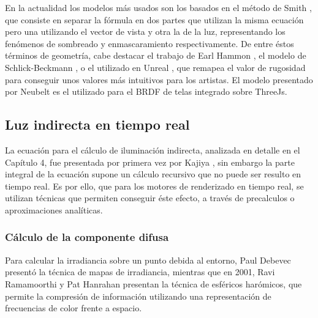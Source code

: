                 
                En la actualidad los modelos m\'as usados son los basados en el m\'etodo de Smith \autocite{smith}, que
                consiste en separar la f\'ormula en dos partes que utilizan la misma ecuaci\'on pero una utilizando el vector de vista
                y otra la de la luz, representando los fen\'omenos de sombreado y enmascaramiento respectivamente. De entre \'estos t\'erminos
                de geometr\'ia, cabe destacar el trabajo de Earl Hammon \autocite{earlhammon}, el modelo de Schlick-Beckmann \autocite{schlick},
                o el utilizado en Unreal \autocite{unreal}, que remapea el valor de rugosidad para conseguir unos valores m\'as intuitivos para
                los artistas. El modelo presentado por Neubelt \autocite{theordertalk} es el utilizado para el BRDF de telas integrado sobre
                ThreeJs.
                
        \subsection{Luz indirecta en tiempo real}
        La ecuaci\'on para el c\'alculo de iluminaci\'on indirecta, analizada en detalle en el Cap\'itulo 4, fue presentada por primera vez
        por Kajiya \autocite{kajiya}, sin embargo la parte integral de la ecuaci\'on supone un c\'alculo recursivo que no puede ser resulto
        en tiempo real. Es por ello, que para los motores de renderizado en tiempo real, se utilizan t\'ecnicas que permiten conseguir
        \'este efecto, a trav\'es de precalculos o aproximaciones anal\'iticas.

            \subsubsection*{C\'alculo de la componente difusa}
            Para calcular la irradiancia sobre un punto debida al entorno, Paul Debevec \autocite{debevec} present\'o la t\'ecnica
            de mapas de irradiancia, mientras que en 2001, Ravi Ramamoorthi y Pat Hanrahan \autocite{sh} presentan la t\'ecnica de esf\'ericos har\'omicos,
            que permite la compresi\'on de informaci\'on utilizando una representaci\'on de frecuencias de color frente a espacio.


